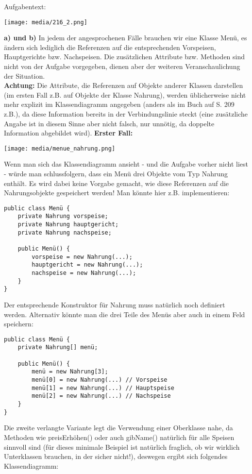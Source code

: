 \documentclass{article}
\begin{document}
\thispagestyle{firstpage}
\setlength{\headsep}{12pt}
Aufgabentext:
\begin{center}
    \texttt{[image: media/216\_2.png]}
\end{center}
\textbf{a) und b)} In jedem der angesprochenen Fälle brauchen wir eine Klasse Menü, es ändern sich lediglich die Referenzen auf die entsprechenden Vorspeisen, Hauptgerichte bzw. Nachspeisen. Die zusätzlichen Attribute bzw. Methoden sind nicht von der Aufgabe vorgegeben, dienen aber der weiteren Veranschaulichung der Situation. \\
\textbf{Achtung:} Die Attribute, die Referenzen auf Objekte anderer Klassen darstellen (im ersten Fall z.B. auf Objekte der Klasse Nahrung), werden üblicherweise nicht mehr explizit im Klassendiagramm angegeben (anders als im Buch auf S. 209 z.B.), da diese Information bereits in der Verbindungslinie steckt (eine zusätzliche Angabe ist in diesem Sinne aber nicht falsch, nur unnötig, da doppelte Information abgebildet wird).
\textbf{Erster Fall:}
\begin{center}
    \texttt{[image: media/menue\_nahrung.png]}
\end{center}
Wenn man sich das Klassendiagramm ansieht - und die Aufgabe vorher nicht liest - würde man schlussfolgern, dass ein Menü drei Objekte vom Typ Nahrung enthält. Es wird dabei keine Vorgabe gemacht, wie diese Referenzen auf die Nahrungsobjekte gespeichert werden! Man könnte hier z.B. implementieren:
\begin{verbatim}
public class Menü {
    private Nahrung vorspeise;
    private Nahrung hauptgericht;
    private Nahrung nachspeise;

    public Menü() {
        vorspeise = new Nahrung(...);
        hauptgericht = new Nahrung(...);
        nachspeise = new Nahrung(...);
    }
}
\end{verbatim}
Der entsprechende Konstruktor für Nahrung muss natürlich noch definiert werden. Alternativ könnte man die drei Teile des Menüs aber auch in einem Feld speichern:
\begin{verbatim}
public class Menü {
    private Nahrung[] menü;

    public Menü() {
        menü = new Nahrung[3];
        menü[0] = new Nahrung(...) // Vorspeise
        menü[1] = new Nahrung(...) // Hauptspeise
        menü[2] = new Nahrung(...) // Nachspeise
    }
}
\end{verbatim}
Die zweite verlangte Variante legt die Verwendung einer Oberklasse nahe, da Methoden wie preisErhöhen() oder auch gibName()  natürlich für alle Speisen sinnvoll sind (für dieses minimale Beispiel ist natürlich fraglich, ob wir wirklich Unterklassen brauchen, in der  sicher nicht!), deswegen ergibt sich folgendes Klassendiagramm:
\end{document}
